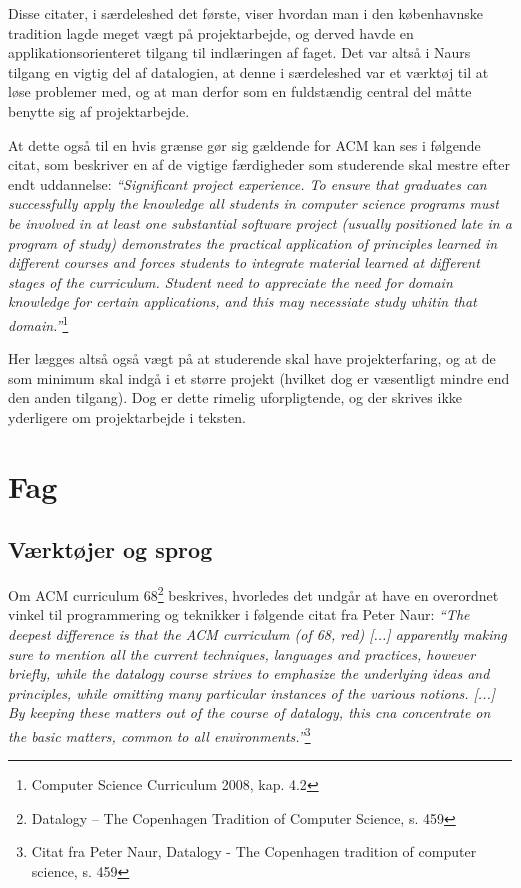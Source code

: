 \documentclass[10pt,a4paper]{article}
\newcommand{\citat}[2]{\vspace{0.1cm}\newline\textit{``#1''}\hspace{0.1cm}\footnote{#2}\vspace{0.1cm}\newline}
\begin{document}
Disse citater, i særdeleshed det første, viser hvordan man i den københavnske
tradition lagde meget vægt på projektarbejde, og derved havde en
applikationsorienteret tilgang til indlæringen af faget. Det var altså i Naurs
tilgang en vigtig del af datalogien, at denne i særdeleshed var et værktøj til
at løse problemer med, og at man derfor som en fuldstændig central del måtte
benytte sig af projektarbejde.

At dette også til en hvis grænse gør sig gældende for ACM kan ses i følgende
citat, som beskriver en af de vigtige færdigheder som studerende skal mestre
efter endt uddannelse: \citat{\emph{Significant project experience}. To ensure
    that graduates can successfully apply the knowledge all students in computer
    science programs must be involved in at least one substantial software
    project (usually positioned late in a program of study) demonstrates the
    practical application of principles learned in different courses and forces
    students to integrate material learned at different stages of the
    curriculum. Student need to appreciate the need for domain knowledge for
    certain applications, and this may necessiate study whitin that
    domain.}{Computer Science Curriculum 2008, kap. 4.2}

Her lægges altså også vægt på at studerende skal have projekterfaring, og at de
som minimum skal indgå i et større projekt (hvilket dog er væsentligt mindre end
den anden tilgang). Dog er dette rimelig uforpligtende, og der skrives ikke
yderligere om projektarbejde i teksten.

\section{Fag}
\subsection{Værktøjer og sprog}
Om ACM curriculum 68\footnote{Datalogy -- The Copenhagen Tradition of Computer
    Science, s. 459} beskrives, hvorledes det undgår at have en overordnet
vinkel til programmering og teknikker i følgende citat fra Peter Naur:
\citat{The deepest difference is that the ACM curriculum (of 68, red) [...]
    apparently making sure to mention all the current techniques, languages and
    practices, however briefly, while the datalogy course strives to emphasize
    the underlying ideas and principles, while omitting many particular
    instances of the various notions. [...] By keeping these matters out of the
    course of datalogy, this cna concentrate on the basic matters, common to all
    environments.}{Citat fra Peter Naur, Datalogy - The Copenhagen tradition of
    computer science, s. 459}
\end{document}
